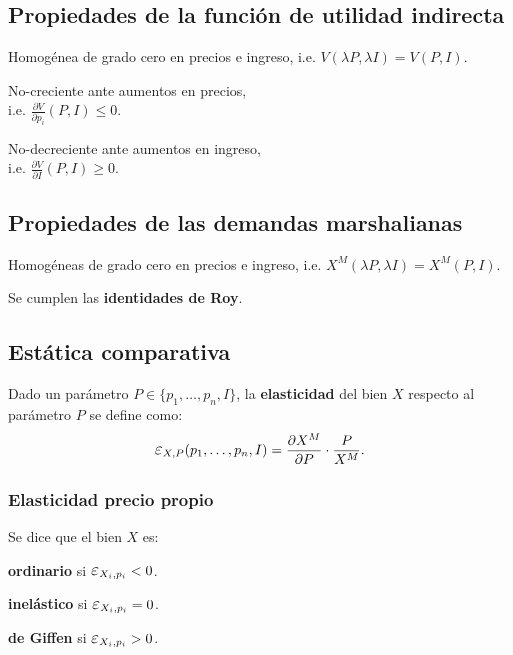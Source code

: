 \documentclass[8pt,a4paper]{extarticle}
\begin{document}
\begin{multicols}{3}
\subsection{Propiedades de la función de utilidad indirecta}

\begin{eqlist}
\item Homogénea de grado cero en precios e ingreso, i.e. $V(\lambda P, \lambda I) = V(P, I)$.
\item No-creciente ante aumentos en precios, \\ i.e. $\displaystyle \frac{\partial V}{\partial p_i} (P, I) \leq 0$.
\item No-decreciente ante aumentos en ingreso, \\ i.e. $\displaystyle \frac{\partial V}{\partial I} (P, I) \geq 0$.
\end{eqlist}

\subsection{Propiedades de las demandas marshalianas}

\begin{eqlist}
\item Homogéneas de grado cero en precios e ingreso, i.e. $X^M (\lambda P, \lambda I) = X^M(P, I)$.
\item Se cumplen las \textbf{identidades de Roy}.
\end{eqlist}

\subsection{Estática comparativa}

\begin{boxdef}[Elasticidad]
	Dado un parámetro $P \in \{ p_1,\ldots, p_n, I \}$, la \textbf{elasticidad} del bien $X$ respecto al parámetro $P$ se define como:
	\[
		\E_{X, P} (p_1,\ldots, p_n, I) = \frac{\partial X^M}{\partial P} \cdot \frac{P}{X^M}
	.\] 
\end{boxdef}

\subsubsection*{Elasticidad precio propio}

Se dice que el bien $X$ es:

\begin{eqlist}
\item \textbf{ordinario} si $ \E_{X_i, p_i} < 0$.
\item \textbf{inelástico} si $\E_{X_i, p_i} = 0$.
\item \textbf{de Giffen} si $\E_{X_i, p_i} > 0$.
\end{eqlist}


\end{multicols}
\end{document}
